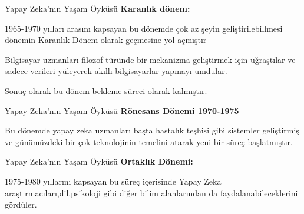 \documentclass{beamer}                                                                                          %
\begin{document}
	\begin{frame}{Yapay Zeka'nın Yaşam Öyküsü}
		\justifying
		    \textbf{\color{myred1}Karanlık dönem:\color{black}}\par \vspace{20}
            \color{myred1} \color{black}1965-1970 yılları arasını kapsayan bu dönemde çok az şeyin geliştirilebillmesi dönemin Karanlık Dönem olarak geçmesine yol açmıştır\par \vspace{10}
            \color{myred1} \color{black}Bilgisayar uzmanları filozof türünde bir  mekanizma geliştirmek için uğraştılar ve sadece verileri yüleyerek akıllı bilgisayarlar yapmayı umdular.\par \vspace{10}
            \color{myred1} \color{black}Sonuç olarak bu dönem bekleme süreci olarak kalmıştır.
    \end{frame}
    
	
	\begin{frame}{Yapay Zeka'nın Yaşam Öyküsü}
		\justifying
        \textbf{\color{myred1}Rönesans Dönemi 1970-1975\color{black}}\par \vspace{20}
        \color{myred1} \color{black}Bu dönemde yapay zeka uzmanları başta hastalık teşhisi gibi sistemler geliştirmiş ve günümüzdeki bir çok  teknolojinin temelini atarak yeni bir süreç başlatmıştır.
    \end{frame}
    
	
	\begin{frame}{Yapay Zeka'nın Yaşam Öyküsü}
		\justifying
		    \textbf{\color{myred1}Ortaklık Dönemi:\color{black}}\par \vspace{20}
            \color{myred1} \color{black}1975-1980 yıllarını kapsayan  bu süreç içerisinde Yapay Zeka araştırmacıları,dil,psikoloji gibi diğer bilim alanlarından da faydalanabileceklerini gördüler.
    \end{frame}
\end{document}
